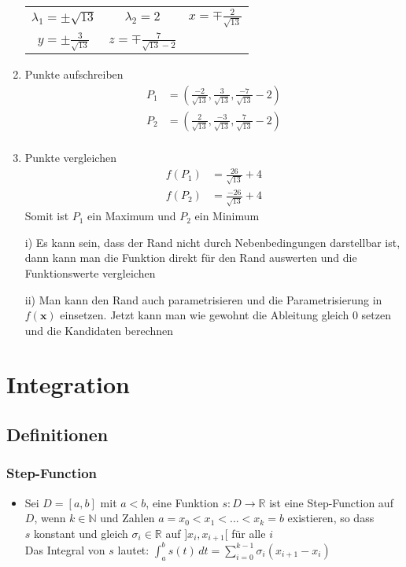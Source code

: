 \documentclass[a3paper, 11pt, landscape]{scrartcl}
\begin{document}
\begin{multicols*}{3}
\begin{enumerate}
\begin{multicols*}{2}
\begin{itemize}
								\end{itemize}
							\end{multicols*}
							\begin{tabular}{ccc}
								$\lambda_1=\pm \sqrt{13}$ &$\lambda_2 =2$ &$x=\mp \frac{2}{\sqrt{13}}$\\
								$y=\pm \frac{3}{\sqrt{13}}$ &$z=\mp \frac{7}{\sqrt{13}-2}$ &\\
							\end{tabular}
							\item Punkte aufschreiben
							\begin{align*}
								P_1&=\left(\frac{-2}{\sqrt{13}}, \frac{3}{\sqrt{13}}, \frac{-7}{\sqrt{13}}-2 \right)\\
								P_2&=\left(\frac{2}{\sqrt{13}}, \frac{-3}{\sqrt{13}}, \frac{7}{\sqrt{13}}-2 \right)\\
							\end{align*}
							\item Punkte vergleichen
							\begin{align*}
								f(P_1)&=\frac{26}{\sqrt{13}}+4\\
								f(P_2)&=\frac{-26}{\sqrt{13}}+4
							\end{align*}
							Somit ist $P_1$ ein Maximum und $P_2$ ein Minimum
						\end{enumerate}
						
					\begin{enumerate}
						\item[i)] Es kann sein, dass der Rand nicht durch Nebenbedingungen darstellbar ist, dann kann man die Funktion direkt für den Rand auswerten und die Funktionswerte vergleichen
						\item[ii)] Man kann den Rand auch parametrisieren und die Parametrisierung in $f(\textbf{x})$ einsetzen. Jetzt kann man wie gewohnt die Ableitung gleich 0 setzen und die Kandidaten berechnen
					\end{enumerate}
	
	\section{Integration}
	\subsection{Definitionen}
	\subsubsection{Step-Function}
	\begin{itemize}
	    \item Sei $D=[a,b]$ mit $a<b$, eine Funktion $s:D\to\mathbb{R}$ ist eine Step-Function auf $D$, wenn $k\in\mathbb{N}$ und Zahlen $a=x_0<x_1<...<x_k=b$ existieren, so dass\\
	    $s$ konstant und gleich $\sigma_i\in\mathbb{R}$ auf $]x_i,x_{i+1}[$ für alle $i$\\
	    Das Integral von $s$ lautet: $\int_a^b s(t)\,dt=\sum_{i=0}^{k-1}\sigma _i(x_{i+1}-x_{i})$
	\end{itemize}

\end{multicols*}
\end{document}
